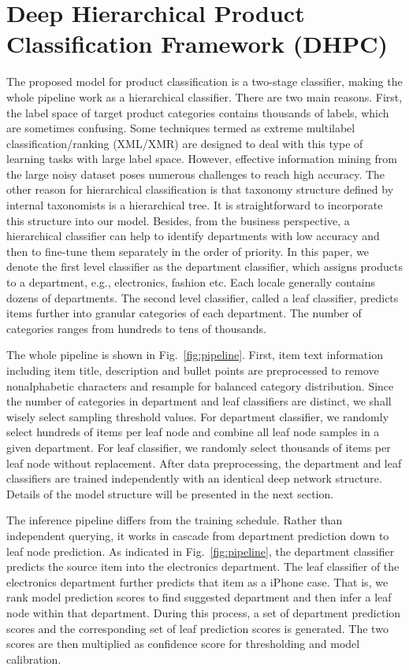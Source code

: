 \documentclass[11pt,dvipsnames]{article}
\begin{document}
\section{Deep Hierarchical Product Classification Framework (DHPC)}
The proposed model for product classification is a two-stage classifier, making the whole pipeline work as a hierarchical classifier. There are two main reasons. First, the label space of target product categories contains thousands of labels, which are sometimes confusing. Some techniques termed as extreme multilabel classification/ranking (XML/XMR) are designed to deal with this type of learning tasks with large label space. However, effective information mining from the large noisy dataset poses numerous challenges to reach high accuracy. The other reason for hierarchical classification is that taxonomy structure defined by internal taxonomists is a hierarchical tree. It is straightforward to incorporate this structure into our model. Besides, from the business perspective, a hierarchical classifier can help to identify departments with low accuracy and then to fine-tune them separately in the order of priority. In this paper, we denote the first level classifier as the department classifier, which assigns products to a department, e.g., electronics, fashion etc. Each locale generally contains dozens of departments. The second level classifier, called a leaf classifier, predicts items further into granular categories of each department. The number of categories ranges from hundreds to tens of thousands. 

The whole pipeline is shown in Fig.~\ref{fig:pipeline}. First, item text information including item title, description and bullet points are preprocessed to remove nonalphabetic characters and resample for balanced category distribution. Since the number of categories in department and leaf classifiers are distinct, we shall wisely select sampling threshold values. For department classifier, we randomly select hundreds of items per leaf node and combine all leaf node samples in a given department. For leaf classifier, we randomly select thousands of items per leaf node without replacement. After data preprocessing, the department and leaf classifiers are trained independently with an identical deep network structure. Details of the model structure will be presented in the next section. 

The inference pipeline differs from the training schedule. Rather than independent querying, it works in cascade from department prediction down to leaf node prediction. As indicated in Fig.~\ref{fig:pipeline}, the department classifier predicts the source item into the electronics department. The leaf classifier of the electronics department further predicts that item as a iPhone case. That is, we rank model prediction scores to find suggested department and then infer a leaf node within that department. During this process, a set of department prediction scores and the corresponding set of leaf prediction scores is generated. The two scores are then multiplied as confidence score for thresholding and model calibration. 
\end{document}
